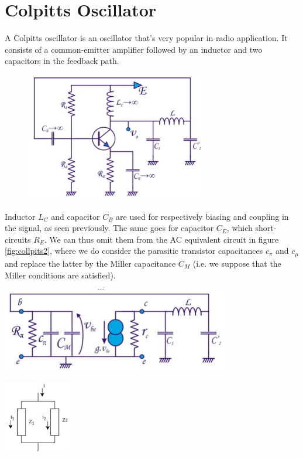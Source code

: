 \section{Colpitts Oscillator}
\label{sec:colpitts}

A Colpitts oscillator is an oscillator that's very popular in radio application. It consists of a common-emitter amplifier followed by an inductor and two capacitors in the feedback path. 

\begin{figure}[h!]
	\centering
	\includegraphics[width=8cm]{figures/ch11/collpits1.jpg}
	\caption{}
	\label{fig:collpits1}
\end{figure}

Inductor $L_C$ and capacitor $C_B$ are used for respectively biasing and coupling in the signal, as seen previously. The same goes for capacitor $C_E$, which short-circuits $R_E$. We can thus omit them from the AC equivalent circuit in figure \ref{fig:collpits2}, where we do consider the parasitic transistor capacitances $c_\pi$ and $c_\mu$ and replace the latter by the Miller capacitance $C_M$ (i.e. we suppose that the Miller conditions are satisfied).

\begin{minipage}{.7\textwidth}
	\centering
	\includegraphics[width=10cm]{figures/ch11/collpits2.jpg}
	\label{fig:collpits2}
\end{minipage}
\begin{minipage}{.3\textwidth}
	\centering
	\includegraphics[width=3cm]{figures/ch11/collpits3.jpg}
	\label{fig:collpits3}
\end{minipage}%



